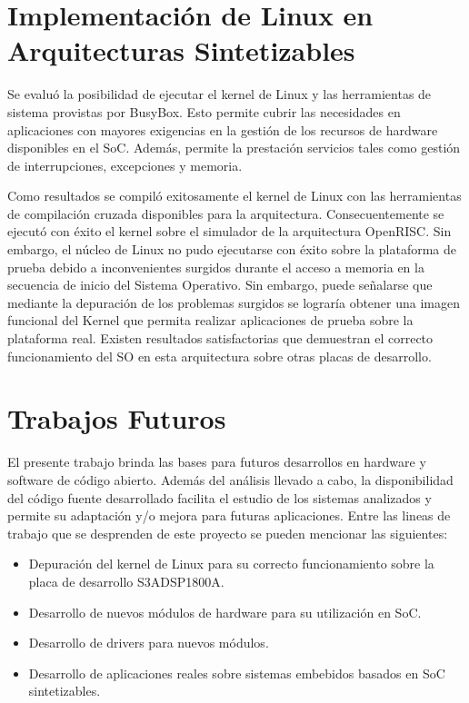 \section{Implementación de Linux en Arquitecturas Sintetizables}

Se evaluó la posibilidad de ejecutar el kernel de Linux y las herramientas de sistema provistas por BusyBox. Esto permite cubrir las necesidades en aplicaciones con mayores exigencias en la gestión de los recursos de hardware disponibles en el SoC. Además, permite la prestación servicios tales como gestión de interrupciones, excepciones y memoria.

Como resultados se compiló exitosamente el kernel de Linux con las herramientas de compilación cruzada disponibles para la arquitectura. Consecuentemente se ejecutó con éxito el kernel sobre el simulador de la arquitectura OpenRISC. Sin embargo, el núcleo de Linux no pudo ejecutarse con éxito sobre la plataforma de prueba debido a inconvenientes surgidos durante el acceso a memoria en la secuencia de inicio del Sistema Operativo. Sin embargo, puede señalarse que mediante la depuración de los problemas surgidos se lograría obtener una imagen funcional del Kernel que permita realizar aplicaciones de prueba sobre la plataforma real. Existen resultados satisfactorias que demuestran el correcto funcionamiento del SO en esta arquitectura sobre otras placas de desarrollo.

\section{Trabajos Futuros}

El presente trabajo brinda las bases para futuros desarrollos en hardware y software de código abierto. Además del análisis llevado a cabo, la disponibilidad del código fuente desarrollado facilita el estudio de los sistemas analizados y permite su adaptación y/o mejora para futuras aplicaciones. Entre las lineas de trabajo que se desprenden de este proyecto se pueden mencionar las siguientes:

\begin {itemize}
\item Depuración del kernel de Linux para su correcto funcionamiento sobre la placa de desarrollo S3ADSP1800A.
\item Desarrollo de nuevos módulos de hardware para su utilización en SoC.
\item Desarrollo de drivers para nuevos módulos.
\item Desarrollo de aplicaciones reales sobre sistemas embebidos basados en SoC sintetizables.
\end{itemize}

